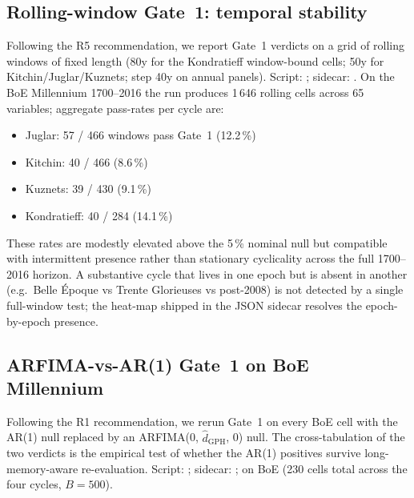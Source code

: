 \subsection{Rolling-window Gate~1: temporal stability}
\label{sec:appendix_rolling}

Following the R5 recommendation, we report Gate~1 verdicts on
a grid of rolling windows of fixed length (80y for the
Kondratieff window-bound cells; 50y for Kitchin/Juglar/Kuznets;
step 40y on annual panels). Script:
; sidecar:
. On the BoE
Millennium 1700--2016 the run produces 1\,646 rolling cells
across 65 variables; aggregate pass-rates per cycle are:

\begin{itemize}
\item Juglar: 57 / 466 windows pass Gate~1 (12.2\,\%)
\item Kitchin: 40 / 466 (8.6\,\%)
\item Kuznets: 39 / 430 (9.1\,\%)
\item Kondratieff: 40 / 284 (14.1\,\%)
\end{itemize}

These rates are modestly elevated above the 5\,\% nominal null
but compatible with intermittent presence rather than
stationary cyclicality across the full 1700--2016 horizon. A
substantive cycle that lives in one epoch but is absent in
another (e.g.\ Belle \'Epoque vs Trente Glorieuses vs
post-2008) is not detected by a single full-window test; the
heat-map shipped in the JSON sidecar resolves the
epoch-by-epoch presence.

\subsection{ARFIMA-vs-AR(1) Gate~1 on BoE Millennium}
\label{sec:appendix_arfima_vs_ar1}

Following the R1 recommendation, we rerun Gate~1 on every
BoE cell with the AR(1) null replaced by an ARFIMA(0,
\(\hat d_{\mathrm{GPH}}\), 0) null. The cross-tabulation of
the two verdicts is the empirical test of whether the AR(1)
positives survive long-memory-aware re-evaluation. Script:
; sidecar:
; on BoE (230 cells
total across the four cycles, \(B=500\)).

